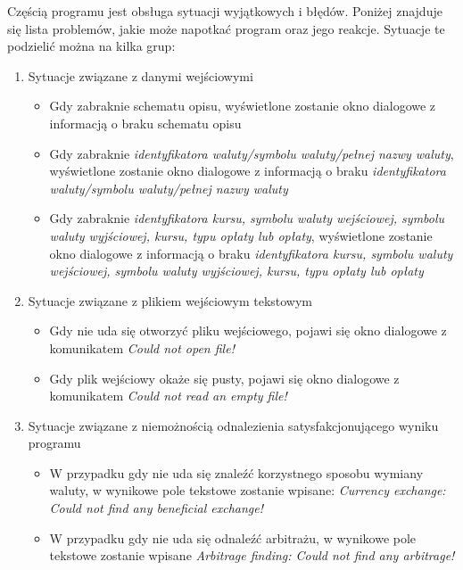 \documentclass[a4paper,11pt]{article}
\newcommand\tab[1][0.6cm]{\hspace*{#1}}
\begin{document}
\tab Częścią programu jest obsługa sytuacji wyjątkowych i błędów. Poniżej znajduje się lista problemów, jakie może napotkać program oraz jego reakcje. Sytuacje te podzielić można na kilka grup:
\\\begin{enumerate}
\item Sytuacje związane z danymi wejściowymi
\begin{itemize}
\item Gdy zabraknie schematu opisu, wyświetlone zostanie okno dialogowe z informacją o braku schematu opisu
\item Gdy zabraknie \textit{identyfikatora waluty/symbolu waluty/pełnej nazwy waluty}, wyświetlone zostanie okno dialogowe z informacją o braku \textit{identyfikatora waluty/symbolu waluty/pełnej nazwy waluty} 
\item Gdy zabraknie \textit{identyfikatora kursu, symbolu waluty wejściowej, symbolu waluty wyjściowej, kursu, typu opłaty lub opłaty}, wyświetlone zostanie okno dialogowe z informacją o braku \textit{identyfikatora kursu, symbolu waluty wejściowej, symbolu waluty wyjściowej, kursu, typu opłaty lub opłaty}

\end{itemize}
\item Sytuacje związane z plikiem wejściowym tekstowym
\begin{itemize}
\item Gdy nie uda się otworzyć pliku wejściowego, pojawi się okno dialogowe z komunikatem \textit{Could not open file!}
\item Gdy plik wejściowy okaże się pusty, pojawi się okno dialogowe z komunikatem \textit{Could not read an empty file!}
\end{itemize}
\item Sytuacje związane z niemożnością odnalezienia satysfakcjonującego wyniku programu
\begin{itemize}
\item W przypadku gdy nie uda się znaleźć korzystnego sposobu wymiany waluty, w wynikowe pole tekstowe zostanie wpisane: \textit{Currency exchange: Could not find any beneficial exchange!}
\item W przypadku gdy nie uda się odnaleźć arbitrażu, w wynikowe pole tekstowe zostanie wpisane \textit{Arbitrage finding: Could not find any arbitrage!}
\end{itemize}
\end{enumerate}
\end{document}
